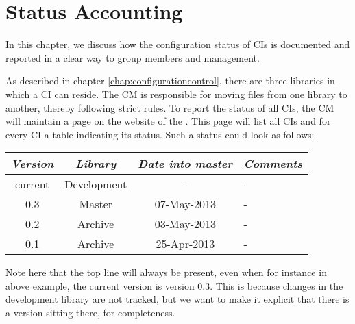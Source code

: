 \chapter{Status Accounting}
\label{chap:statusaccounting}
In this chapter, we discuss how the configuration status of CIs is documented and reported in a clear way to group members and management.

As described in chapter \ref{chap:configurationcontrol}, there are three libraries in which a CI can reside. The CM is responsible for moving files from one library to another, thereby following strict rules. To report the status of all CIs, the CM will maintain a page on the website of the \applicationname{}. This page will list all CIs and for every CI a table indicating its status. Such a status could look as follows:

\begin{center}
\begin{tabular}{@{}cccl@{}}
	\toprule
	\emph{Version} & \emph{Library} & \emph{Date into master} & \emph{Comments} \\
	\midrule
	current & Development &           - & - \\
	0.3     & Master      & 07-May-2013 & - \\
	0.2     & Archive     & 03-May-2013 & - \\
	0.1     & Archive     & 25-Apr-2013 & - \\
	\bottomrule
\end{tabular}
\end{center}

\noindent Note here that the top line will always be present, even when for instance in above example, the current version is version 0.3. This is because changes in the development library are not tracked, but we want to make it explicit that there is a version sitting there, for completeness.